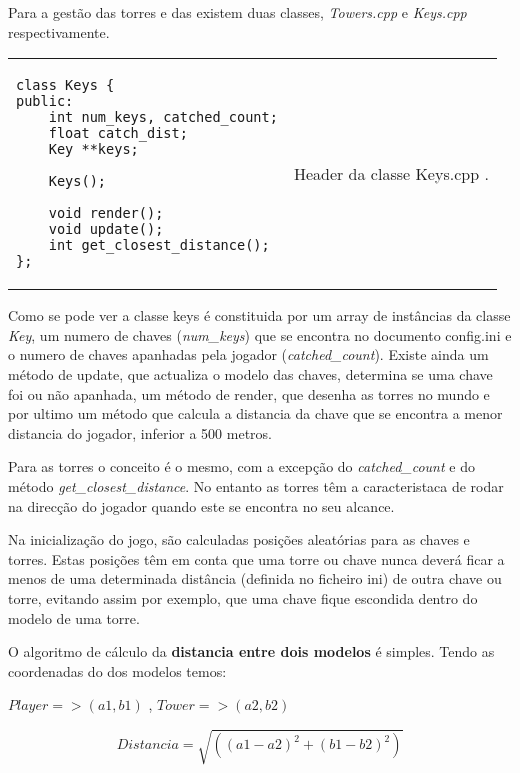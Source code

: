Para a gestão das torres e das existem duas classes, \textit{Towers.cpp} e \textit{Keys.cpp} respectivamente.

\-
\begin{center}
\begin{tabular} {l | p{10cm}}
\begin{lstlisting}[caption=Cabeçalho da classe Keys]
class Keys {
public:
    int num_keys, catched_count;
    float catch_dist;
    Key **keys;

    Keys();

    void render();
    void update();
    int get_closest_distance();
};
\end{lstlisting} 
& 
Header da classe Keys.cpp .
\end{tabular}
\end{center}
\-
Como se pode ver a classe keys é constituida por um array de instâncias da classe \emph{Key}, um numero de chaves (\emph{num\_keys}) que se encontra no documento config.ini e o numero de chaves apanhadas pela jogador (\emph{catched\_count}).
Existe ainda um método de update, que actualiza o modelo das chaves, determina se uma chave foi ou não apanhada, um método de render, que desenha as torres no mundo e por ultimo um método que calcula a distancia da chave que se encontra a menor distancia do jogador, inferior a 500 metros.

Para as torres o conceito é o mesmo, com a excepção do \emph{catched\_count} e do método \emph{get\_closest\_distance}.
No entanto as torres têm a caracteristaca de rodar na direcção do jogador quando este se encontra no seu alcance.

Na inicialização do jogo, são calculadas posições aleatórias para as chaves e torres. Estas posições têm em conta que uma torre ou chave nunca deverá ficar a menos de uma determinada distância (definida no ficheiro ini) de outra chave ou torre, evitando assim por exemplo, que uma chave fique escondida dentro do modelo de uma torre.

O algoritmo de cálculo da {\bf distancia entre dois modelos} é simples. Tendo as coordenadas do dos modelos temos:

\begin{center}
\begin{math}
Player => (a1,b1)
\end{math}
,
\begin{math}
Tower => (a2,b2)
\end{math}

\begin{equation}
Distancia = \sqrt{((a1-a2)^2+(b1-b2)^2)}
\end{equation}
\end{center}


